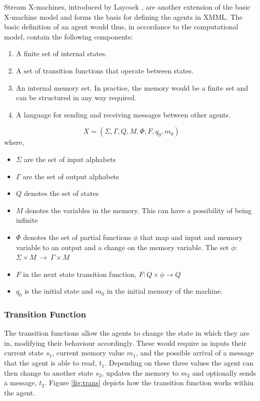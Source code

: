 \documentclass[a4paper,11pt]{article}
\begin{document}
Stream X-machines, introduced by Laycock \cite{LAYCOCK:streamxm},
are another extension of the basic X-machine model and forms the
basis for defining the agents in XMML. The basic definition of an
agent would thus, in accordance to the computational model, contain
the following components:
\begin{enumerate}
 \item A finite set of internal states.
 \item A set of transition functions that operate between states.
 \item An internal memory set. In practice, the memory would be a finite set and can be structured in any way required.
 \item A language for sending and receiving messages between other agents.
\end{enumerate}

\begin{equation}\label{streamxmachine}
    X = (\Sigma, \Gamma, Q, M, \Phi, F, q_{0}, m_{0})
\end{equation}
where,
\begin{itemize}
\item $\Sigma$ are the set of input alphabets
\item $\Gamma$ are the set of output alphabets
\item $Q$ denotes the set of states
\item $M$ denotes the variables in the memory. This can have a
possibility of being infinite
\item $\Phi$ denotes the set of partial functions $\phi$ that map
and input and memory variable to an output and a change on the
memory variable. The set $\phi$: $\Sigma \times M\ \longrightarrow\
\Gamma\times M$
\item $F$ in the next state transition function, $F : Q \times\phi\longrightarrow
Q$
\item $q_{0}$ is the initial state and $m_{0}$ in the initial memory
of the machine.
\end{itemize}

\subsubsection{Transition Function}
The transition functions allow the agents to change the state in
which they are in, modifying their behaviour accordingly. These would
require as inputs their current state $s_{1}$, current memory value
$m_{1}$, and the possible arrival of a message that the agent is able to
read, $t_{1}$. Depending on these three values the agent can then
change to another state $s_{2}$, updates the memory to $m_{2}$ and
optionally sends a message, $t_{2}$. Figure
\ref{fig:trans} depicts how the transition function
works within the agent.
\end{document}
